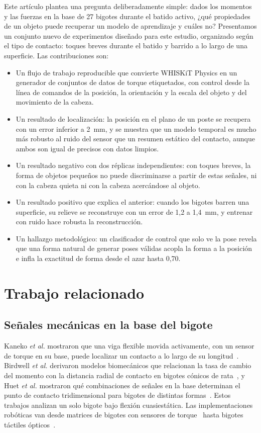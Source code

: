 \documentclass[conference]{IEEEtran}
\begin{document}
Este artículo plantea una pregunta deliberadamente simple: dados los momentos y las fuerzas en la base de 27 bigotes durante el batido activo, ¿qué propiedades de un objeto puede recuperar un modelo de aprendizaje y cuáles no? Presentamos un conjunto nuevo de experimentos diseñado para este estudio, organizado según el tipo de contacto: toques breves durante el batido y barrido a lo largo de una superficie. Las contribuciones son:
\begin{itemize}
\item Un flujo de trabajo reproducible que convierte WHISKiT Physics en un generador de conjuntos de datos de torque etiquetados, con control desde la línea de comandos de la posición, la orientación y la escala del objeto y del movimiento de la cabeza.
\item Un resultado de localización: la posición en el plano de un poste se recupera con un error inferior a 2~mm, y se muestra que un modelo temporal es mucho más robusto al ruido del sensor que un resumen estático del contacto, aunque ambos son igual de precisos con datos limpios.
\item Un resultado negativo con dos réplicas independientes: con toques breves, la forma de objetos pequeños no puede discriminarse a partir de estas señales, ni con la cabeza quieta ni con la cabeza acercándose al objeto.
\item Un resultado positivo que explica el anterior: cuando los bigotes barren una superficie, su relieve se reconstruye con un error de 1,2 a 1,4~mm, y entrenar con ruido hace robusta la reconstrucción.
\item Un hallazgo metodológico: un clasificador de control que solo ve la pose revela que una forma natural de generar poses válidas acopla la forma a la posición e infla la exactitud de forma desde el azar hasta 0,70.
\end{itemize}

\section{Trabajo relacionado}
\subsection{Señales mecánicas en la base del bigote}
Kaneko \emph{et al.} mostraron que una viga flexible movida activamente, con un sensor de torque en su base, puede localizar un contacto a lo largo de su longitud~\cite{kaneko1998}. Birdwell \emph{et al.} derivaron modelos biomecánicos que relacionan la tasa de cambio del momento con la distancia radial de contacto en bigotes cónicos de rata~\cite{birdwell2007}, y Huet \emph{et al.} mostraron qué combinaciones de señales en la base determinan el punto de contacto tridimensional para bigotes de distintas formas~\cite{huet2017}. Estos trabajos analizan un solo bigote bajo flexión cuasiestática. Las implementaciones robóticas van desde matrices de bigotes con sensores de torque~\cite{solomon2006,pearson2011} hasta bigotes táctiles ópticos~\cite{lepora2018}.
\end{document}
